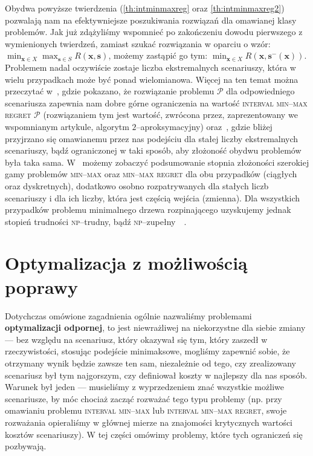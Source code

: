 Obydwa powyższe twierdzenia (\ref{th:intminmaxreg} oraz \ref{th:intminmaxreg2}) pozwalają nam na efektywniejsze poszukiwania rozwiązań dla omawianej klasy problemów. Jak już zdążyliśmy wspomnieć po zakończeniu dowodu pierwszego z wymienionych twierdzeń, zamiast szukać rozwiązania w oparciu o wzór: $\min_{\textbf{x} \in X} \max_{\textbf{s} \in S} R \left( \textbf{x}, \textbf{s} \right)$, możemy zastąpić go tym: $\min_{\textbf{x} \in X} R \left( \textbf{x}, \textbf{s}^{-} \left( \textbf{x} \right) \right)$. Problemem nadal oczywiście zostaje liczba ekstremalnych scenariuszy, która w wielu przypadkach może być ponad wielomianowa. Więcej na ten temat można przeczytać w~\cite{intervalregMST}, gdzie pokazano, że rozwiązanie problemu $\mathcal{P}$ dla odpowiedniego scenariusza zapewnia nam dobre górne ograniczenia na wartość \textsc{interval min--max regret $\mathcal{P}$} (rozwiązaniem tym jest wartość, zwrócona przez, zaprezentowany we wspomnianym artykule, algorytm $2$--aproksymacyjny) oraz~\cite{intervalregMST2}, gdzie bliżej przyjrzano się omawianemu przez nas podejściu dla stałej liczby ekstremalnych scenariuszy, bądź ograniczonej w taki sposób, aby złożoność obydwu problemów była taka sama. W~\cite{DBLP:journals/ol/KasperskiZ15} możemy zobaczyć podsumowanie stopnia złożoności szerokiej gamy problemów \textsc{min--max} oraz \textsc{min--max regret} dla obu przypadków (ciągłych oraz dyskretnych), dodatkowo osobno rozpatrywanych dla stałych liczb scenariuszy i dla ich liczby, która jest częścią wejścia (zmienna). Dla wszystkich przypadków problemu minimalnego drzewa rozpinającego uzyskujemy jednak stopień trudności \textsc{np}--trudny, bądź \textsc{np}--zupełny~\cite{minmaxApprox}~\cite{intervalregMST2}.

\section{Optymalizacja z możliwością poprawy}

Dotychczas omówione zagadnienia ogólnie nazwaliśmy problemami \textbf{optymalizacji odpornej}, to jest niewrażliwej na niekorzystne dla siebie zmiany --- bez względu na scenariusz, który okazywał się tym, który zaszedł w rzeczywistości, stosując podejście minimaksowe, mogliśmy zapewnić sobie, że otrzymany wynik będzie zawsze ten sam, niezależnie od tego, czy zrealizowany scenariusz był tym najgorszym, czy definiował koszty w najlepszy dla nas sposób. Warunek był jeden --- musieliśmy z wyprzedzeniem znać wszystkie możliwe scenariusze, by móc chociaż zacząć rozważać tego typu problemy (np. przy omawianiu problemu \textsc{interval min--max} lub \textsc{interval min--max regret}, swoje rozważania opieraliśmy w głównej mierze na znajomości krytycznych wartości kosztów scenariuszy). W tej części omówimy problemy, które tych ograniczeń się pozbywają.

